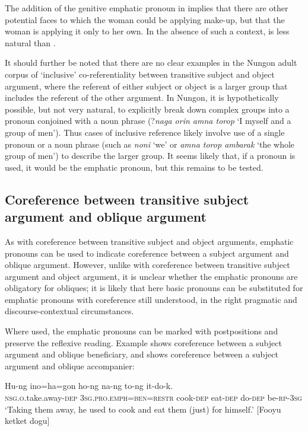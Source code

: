 \documentclass[output=paper,colorlinks,citecolor=brown]{langscibook}
\begin{document}
The addition of the genitive emphatic pronoun in  implies that there are other potential faces to which the woman could be applying make-up, but that the woman is applying it only to her own. In the absence of such a context,  is less natural than .

It should further be noted that there are no clear examples in the Nungon adult corpus of ‘inclusive’ co-referentiality between transitive subject and object argument, where the referent of either subject or object is a larger group that includes the referent of the other argument. In Nungon, it is hypothetically possible, but not very natural, to explicitly break down complex groups into a pronoun conjoined with a noun phrase (?\textit{naga orin amna torop} ‘I myself and a group of men’). Thus cases of inclusive reference likely involve use of a single pronoun or a noun phrase (such as \textit{noni} ‘we’ or \textit{amna torop ambarak} ‘the whole group of men’) to describe the larger group. It seems likely that, if a pronoun is used, it would be the emphatic pronoun, but this remains to be tested. 

\subsection{Coreference between transitive subject argument and oblique argument}\label{sec:sarvasy:3.2}

As with coreference between transitive subject and object arguments, emphatic pronouns can be used to indicate coreference between a subject argument and oblique argument. However, unlike with coreference between transitive subject argument and object argument, it is unclear whether the emphatic pronouns are obligatory for obliques; it is likely that here basic pronouns can be substituted for emphatic pronouns with coreference still understood, in the right pragmatic and discourse-contextual circumstances. 

Where used, the emphatic pronouns can be marked with postpositions and preserve the reflexive reading. Example  shows coreference between a subject argument and oblique beneficiary, and  shows coreference between a subject argument and oblique accompanier:

\ea%
    \label{ex:sarvasy:17}
    \gll    Hu-ng ino=ha=gon ho-ng na-ng to-ng  it-do-k.\\
            \textsc{nsg.o.}take.away-\textsc{dep} \textsc{3sg.pro.emph=ben=restr} cook-\textsc{dep} eat-\textsc{dep} do-\textsc{dep}  be-\textsc{rp-3sg}\\
    \glt    ‘Taking them away, he used to cook and eat them (just) for himself.’ [Fooyu ketket dogu]
\z
\end{document}
